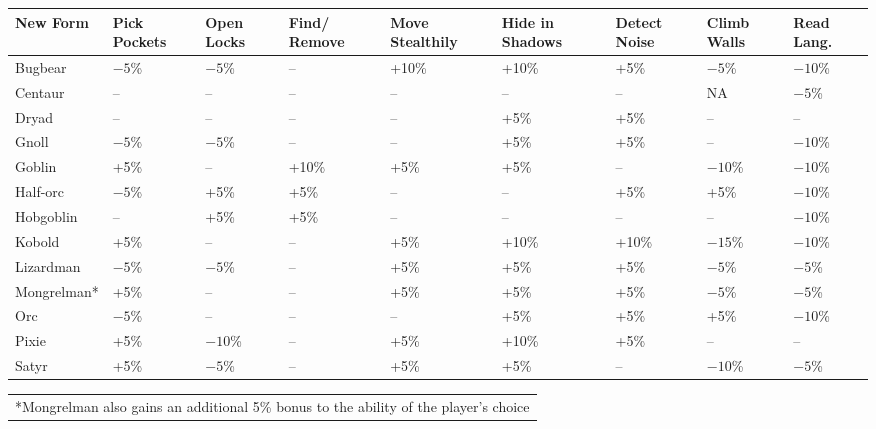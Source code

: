\noindent
\begin{minipage}{\textwidth}

\noindent
{}
\begin{tabular}{|p{}|p{}|p{}|p{}|p{}|p{}|p{}|p{}|p{}|}
\hline
New Form	& Pick Pockets	& Open Locks	& Find/ Remove	& Move Stealthily	& Hide in Shadows	& Detect Noise	& Climb Walls	& Read Lang. \\
\hline\hline
\rowcolor[gray]{0.9}Bugbear		& $-5$\%	& $-5$\%	& --	& +10\%	& +10\%	& +5\%	& $-5$\%	& $-10$\% \\
Centaur		& --	& --	& --	& --	& --	& --	& NA	& $-5$\% \\
\rowcolor[gray]{0.9}Dryad		& --	& --	& --	& --	& +5\%	& +5\%	& --	& -- \\
Gnoll		& $-5$\%	& $-5$\%	& --	& --	& +5\%	& +5\%	& --	& $-10$\% \\
\rowcolor[gray]{0.9}Goblin		& +5\%	& --	& +10\%	& +5\%	& +5\%	& --	& $-10$\%	& $-10$\% \\
Half-orc	& $-5$\%	& +5\%	& +5\%	& --	& --	& +5\%	& +5\%	& $-10$\% \\
\rowcolor[gray]{0.9}Hobgoblin	& --	& +5\%	& +5\%	& --	& --	& --	& --	& $-10$\% \\
Kobold		& +5\%	& --	& --	& +5\%	& +10\%	& +10\%	& $-15$\%	& $-10$\% \\
\rowcolor[gray]{0.9}Lizardman	& $-5$\%	& $-5$\%	& --	& +5\%	& +5\%	& +5\%	& $-5$\%	& $-5$\% \\
Mongrelman*	& +5\%	& --	& --	& +5\%	& +5\%	& +5\%	& $-5$\%	& $-5$\% \\
\rowcolor[gray]{0.9}Orc			& $-5$\%	& --	& --	& --	& +5\%	& +5\%	& +5\%	& $-10$\% \\
Pixie		& +5\%	& $-10$\%	& --	& +5\%	& +10\%	& +5\%	& --	& -- \\
\rowcolor[gray]{0.9}Satyr		& +5\%	& $-5$\%	& --	& +5\%	& +5\%	& --	& $-10$\%	& $-5$\% \\
\hline
\end{tabular}
\noindent\begin{tabular}{p{}}
*Mongrelman also gains an additional 5\% bonus to the ability of the player's choice \\
\end{tabular}\vspace{.5em}

\end{minipage}

